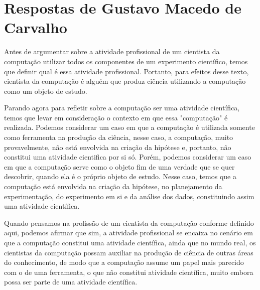 \section{Respostas de Gustavo Macedo de Carvalho}

Antes de argumentar sobre a atividade profissional de um cientista da computação utilizar todos os componentes de um experimento científico, temos que definir qual é essa atividade profissional. Portanto, para efeitos desse texto, cientista da computação é alguém que produz ciência utilizando a computação como um objeto de estudo.

Parando agora para refletir sobre a computação ser uma atividade científica, temos que levar em consideração o contexto em que essa "computação" é realizada. Podemos considerar um caso em que a computação é utilizada somente como ferramenta na produção da ciência, nesse caso, a computação, muito provavelmente, não está envolvida na criação da hipótese e, portanto, não constitui uma atividade cientifica por si só. Porém, podemos considerar um caso em que a computação serve como o objeto fim de uma verdade que se quer descobrir, quando ela é o próprio objeto de estudo. Nesse caso, temos que a computação está envolvida na criação da hipótese, no planejamento da experimentação, do experimento em si e da análise dos dados, constituindo assim uma atividade científica.

Quando pensamos na profissão de um cientista da computação conforme definido aqui, podemos afirmar que sim, a atividade profissional se encaixa no cenário em que a computação constitui uma atividade científica, ainda que no mundo real, os cientistas da computação possam auxiliar na produção de ciência de outras áreas do conhecimento, de modo que a computação assume um papel mais parecido com o de uma ferramenta, o que não constitui atividade científica, muito embora possa ser parte de uma atividade científica.